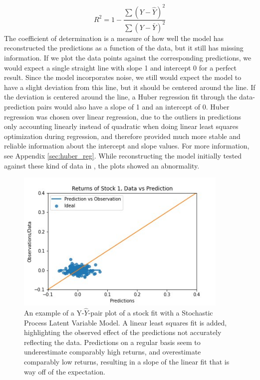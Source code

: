 \begin{equation}%
	R^2 = 1 - \frac{\sum (Y-\hat{Y})^2}{\sum (Y-\bar{Y})^2}
	\label{eq: GPLVM R^2 calculation}
\end{equation}
The coefficient of determination is a measure of how well the model has reconstructed the predictions as a function of the data, but it still has missing information. If we plot the data points against the corresponding predictions, we would expect a single straight line with slope 1 and intercept 0 for a perfect result. Since the model incorporates noise, we still would expect the model to have a slight deviation from this line, but it should be centered around the line. If the deviation is centered around the line, a Huber regression fit through the data-prediction pairs would also have a slope of 1 and an intercept of 0.  Huber regression was chosen over linear regression, due to the outliers in predictions only accounting linearly instead of quadratic when doing linear least squares optimization during regression, and therefore provided much more stable and reliable information about the intercept and slope values. For more information, see Appendix \ref{sec:huber_reg}. While reconstructing the model initially tested against these kind of data in \cite{Nirwan_2019}, the plots showed an abnormality.
\begin{figure}%
	\centering
	\includegraphics[width=4in]{img/07_0/problem.jpg}
	\caption[Data-Prediction Plot GPLVM]
	{An example of a Y-$\hat{Y}$-pair plot of a stock fit with a Stochastic Process Latent Variable Model. A linear least squares fit is added, highlighting the observed effect of the predictions not accurately reflecting the data. Predictions on a regular basis seem to underestimate comparably high returns, and overestimate comparably low returns, resulting in a slope of the linear fit that is way off of the expectation.}
	\label{fig:gplvm_pair_plot_central}
\end{figure}
